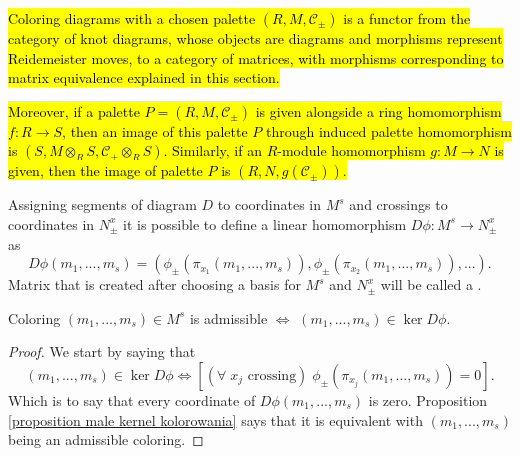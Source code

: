 \hl{Coloring diagrams with a chosen palette $(R, M, \mathcal{C}_\pm)$ is a functor from the category of knot diagrams, whose objects are diagrams and morphisms represent Reidemeister moves, to a category of matrices, with morphisms corresponding to matrix equivalence explained in this section.}

\hl{Moreover, if a palette $P=(R, M, \mathcal{C}_\pm)$ is given alongside a ring homomorphism $f:R\to S$, then an image of this palette $P$ through induced palette homomorphism is $(S, M\otimes_R S, \mathcal{C}_\pm\otimes_R S)$. Similarly, if an $R$-module homomorphism $g:M\to N$ is given, then the image of palette $P$ is $(R, N, g(\mathcal{C}_\pm))$.}

\begin{definition}\label{def:color checking matrix}
  Assigning segments of diagram $D$ to coordinates in $M^s$ and crossings to coordinates in $N_\pm^x$ it is possible to define a linear homomorphism $D\phi:M^s\to N_\pm^x$  as
  $$D\phi(m_1,...,m_s)=(\phi_\pm(\pi_{x_1}(m_1,...,m_s)), \phi_\pm(\pi_{x_2}(m_1,...,m_s)),...).$$
  Matrix that is created after choosing a basis for $M^s$ and $N_\pm^x$ will be called a .
\end{definition}

\begin{proposition}\label{admissible coloring is kernel}
  Coloring $(m_1,...,m_s)\in M^s$ is admissible $\iff$ $(m_1,...,m_s)\in\ker D\phi$.
\end{proposition}

\begin{proof}
  We start by saying that 
  $$(m_1,..., m_s)\in\ker D\phi\iff [(\forall\;x_j\text{ crossing})\;\phi_\pm(\pi_{x_j}(m_1,..., m_s))=0].$$
  Which is to say that every coordinate of $D\phi(m_1,..., m_s)$ is zero. Proposition \cref{proposition male kernel kolorowania} says that it is equivalent with $(m_1,..., m_s)$ being an admissible coloring.
\end{proof}

